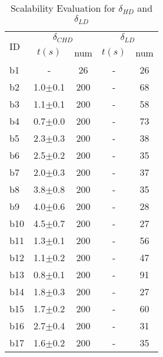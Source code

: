 \begin{longtable}{|l|c|c|c|c|}
\caption{\label{tab:distances}{Scalability Evaluation for $\delta_{HD}$ and $\delta_{LD}$}}\\
\hline
\multirow{2}{*}{ID}&\multicolumn{2}{c|}{$\delta_{CHD}$}&\multicolumn{2}{c|}{$\delta_{LD}$}\\
\cline{2-5}
&$t(s)$&num&$t(s)$&num\\
\hline
b1&- & 26&- & 26
\\
b2&1.0$\pm$0.1 & 200 &- & 68
\\
b3&1.1$\pm$0.1 & 200 &- & 58
\\
b4&0.7$\pm$0.0 & 200 &- & 73
\\
b5&2.3$\pm$0.3 & 200 &- & 38
\\
b6&2.5$\pm$0.2 & 200 &- & 35
\\
b7&2.0$\pm$0.3 & 200 &- & 37
\\
b8&3.8$\pm$0.8 & 200 &- & 35
\\
b9&4.0$\pm$0.6 & 200 &- & 28
\\
b10&4.5$\pm$0.7 & 200 &- & 27
\\
b11&1.3$\pm$0.1 & 200 &- & 56
\\
b12&1.1$\pm$0.2 & 200 &- & 47
\\
b13&0.8$\pm$0.1 & 200 &- & 91
\\
b14&1.8$\pm$0.3 & 200 &- & 27
\\
b15&1.7$\pm$0.2 & 200 &- & 60
\\
b16&2.7$\pm$0.4 & 200 &- & 31
\\
b17&1.6$\pm$0.2 & 200 &- & 35
\\
\hline
\end{longtable}
